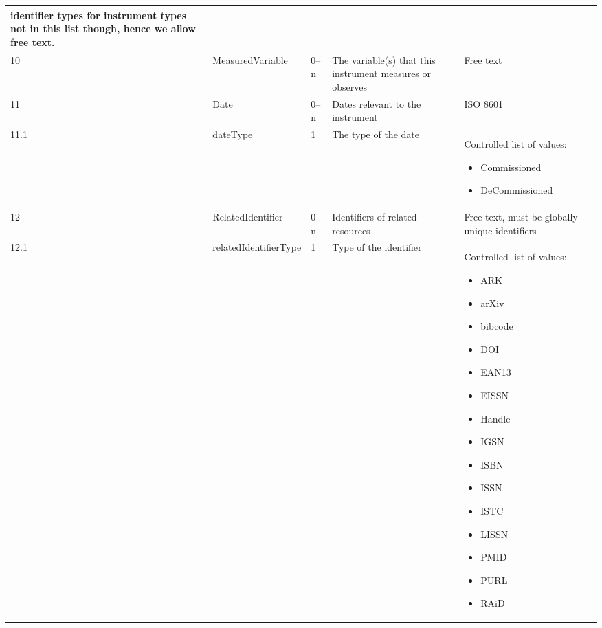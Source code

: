 \documentclass[titlepage=true,twoside=false,DIV=13]{scrartcl}
\begin{document}
\begin{longtable}{|l|l|l|p{}|p{\valcolw}|}
          identifier types for instrument types not in this list
          though, hence we allow free text.  \\
  \hline
  10    & MeasuredVariable             & 0--n
        & The variable(s) that this instrument measures or observes
        & Free text \\
  \hline
  11    & Date                         & 0--n
        & Dates relevant to the instrument & ISO 8601 \\
  \hline
  11.1  & dateType                     & 1
        & The type of the date
        & \begin{minipage}[t]{\valcolw}
            Controlled list of values:
            \begin{itemize}[nosep,leftmargin=3.5ex]
            \item Commissioned
            \item DeCommissioned
            \end{itemize}
            \vspace{1ex}
          \end{minipage} \\
  \hline
  12    & RelatedIdentifier            & 0--n
        & Identifiers of related resources
        & Free text, must be globally unique identifiers \\
  \hline
  12.1  & relatedIdentifierType        & 1
        & Type of the identifier
        & \begin{minipage}[t]{\valcolw}
            Controlled list of values:
            \begin{itemize}[nosep,leftmargin=3.5ex]
            \item ARK
            \item arXiv
            \item bibcode
            \item DOI
            \item EAN13
            \item EISSN
            \item Handle
            \item IGSN
            \item ISBN
            \item ISSN
            \item ISTC
            \item LISSN
            \item PMID
            \item PURL
            \item RAiD

\end{itemize}
\end{minipage}
\end{longtable}
\end{document}
